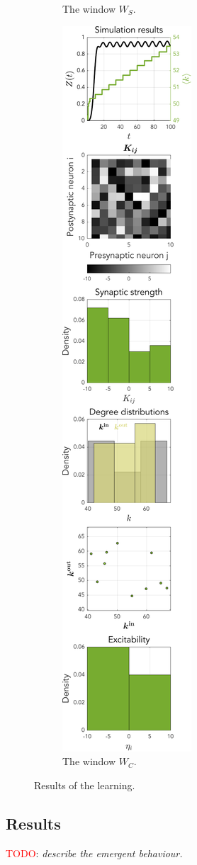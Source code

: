 \begin{figure}[H]
\begin{subfigure}[b]{0.32\linewidth}
   \caption{The window $W_S$.}
   \label{fig:STDPWS}
\end{subfigure} \hfill
\begin{subfigure}[b]{0.32\linewidth}
   \centering
  \includegraphics[width=\linewidth, trim={0 0 0 0},clip]{../Figures/Learning/STDPandIPChrolCannon.pdf}
   \caption{The window $W_C$.}
   \label{fig:STDPWC}
\end{subfigure}
   \caption{Results of the \STDP learning.}
   \label{fig:STDPresults}
\end{figure}



\subsection{Results}
\textcolor{red}{TODO}: \textsl{describe the emergent behaviour.}

